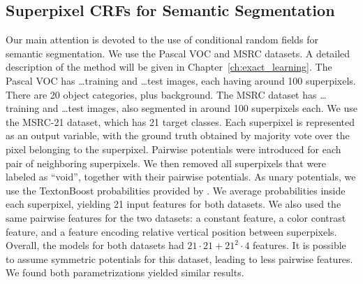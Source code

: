 \subsection{Superpixel CRFs for Semantic Segmentation}
Our main attention is devoted to the use of conditional random fields for
semantic segmentation.  We use the Pascal VOC and MSRC datasets. A detailed
description of the method will be given in Chapter~\ref{ch:exact_learning}.
The Pascal VOC has \ldots training and \ldots test images, each having
around 100 superpixels. There are 20 object categories, plus background. The %
MSRC dataset has \ldots training and \ldots test images, also segmented in
around 100 superpixels each. We use the MSRC-21 dataset, which has 21 target
classes.
Each superpixel is represented as an output variable, with the ground truth obtained
by majority vote over the pixel belonging to the superpixel.
Pairwise potentials were introduced for each pair of neighboring superpixels.
We then removed all superpixels that were labeled as ``void'', together with
their pairwise potentials.
As unary potentials, we use the TextonBoost probabilities provided by \citet{krahenbuhl2012efficient}.
We average probabilities inside each superpixel, yielding 21 input features for both datasets.
We also used the same pairwise features for the two datasets: a constant feature,
a color contrast feature, and a feature encoding relative vertical position between superpixels.
Overall, the models for both datasets had $21 \cdot 21 + 21^2 \cdot 4$ features.
It is possible to assume symmetric potentials for this dataset, leading to less
pairwise features.  We found both parametrizations yielded similar results.


